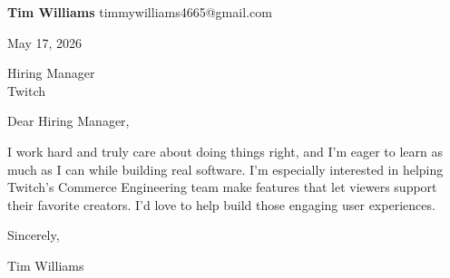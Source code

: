 \documentclass[12pt]{article}
\begin{document}
\textbf{Tim Williams} \hfill timmywilliams4665@gmail.com

\vspace{1em}

May 17, 2026

\vspace{1em}

Hiring Manager \\
Twitch

\vspace{1em}

Dear Hiring Manager,

I work hard and truly care about doing things right, and I'm eager to learn as much as I can while building real software. I'm especially interested in helping Twitch's Commerce Engineering team make features that let viewers support their favorite creators. I'd love to help build those engaging user experiences.

\vspace{1em}

Sincerely,

\vspace{2em}

Tim Williams
\end{document}
